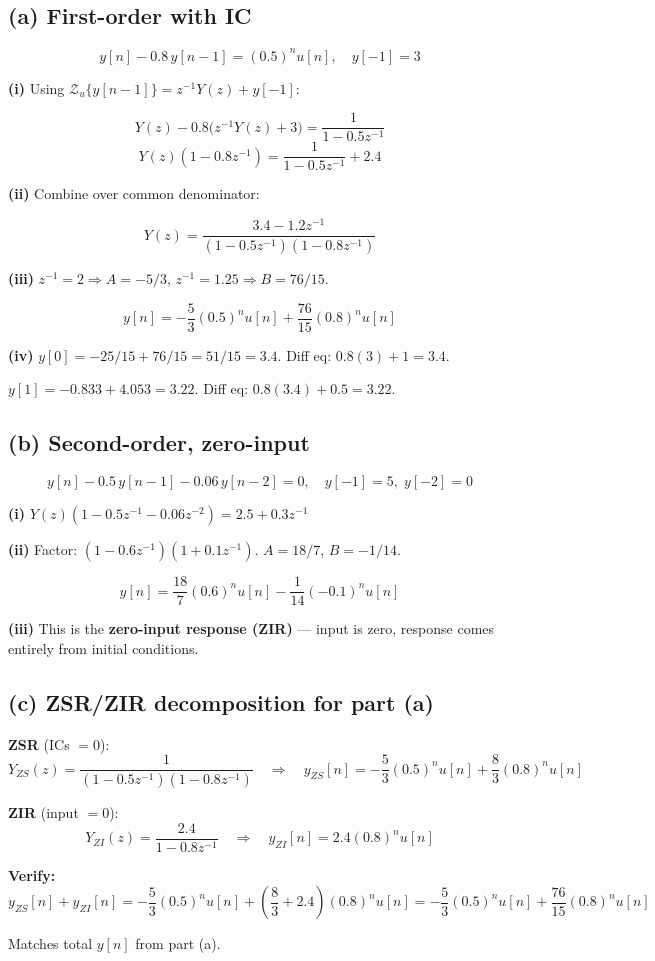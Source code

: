 \documentclass[11pt]{article}
\begin{document}
\subsection*{(a) First-order with IC}

\[
y[n] - 0.8\,y[n-1] = (0.5)^n u[n], \quad y[-1] = 3
\]

\textbf{(i)} Using $\mathcal{Z}_u\{y[n-1]\} = z^{-1}Y(z) + y[-1]$:

\[
Y(z) - 0.8\bigl(z^{-1}Y(z) + 3\bigr) = \frac{1}{1 - 0.5z^{-1}}
\]
\[
Y(z)(1 - 0.8z^{-1}) = \frac{1}{1 - 0.5z^{-1}} + 2.4
\]

\textbf{(ii)} Combine over common denominator:

\[
Y(z) = \frac{3.4 - 1.2z^{-1}}{(1 - 0.5z^{-1})(1 - 0.8z^{-1})}
\]

\textbf{(iii)} $z^{-1}=2 \Rightarrow A = -5/3$, \quad $z^{-1}=1.25 \Rightarrow B = 76/15$.

\begin{equation*}
\boxed{y[n] = -\frac{5}{3}(0.5)^n u[n] + \frac{76}{15}(0.8)^n u[n]}
\end{equation*}

\textbf{(iv)} $y[0] = -25/15 + 76/15 = 51/15 = 3.4$. Diff eq: $0.8(3)+1 = 3.4$. \checkmark

$y[1] = -0.833 + 4.053 = 3.22$. Diff eq: $0.8(3.4)+0.5 = 3.22$. \checkmark

\subsection*{(b) Second-order, zero-input}

\[
y[n] - 0.5\,y[n-1] - 0.06\,y[n-2] = 0, \quad y[-1] = 5,\; y[-2] = 0
\]

\textbf{(i)} $Y(z)(1 - 0.5z^{-1} - 0.06z^{-2}) = 2.5 + 0.3z^{-1}$

\textbf{(ii)} Factor: $(1 - 0.6z^{-1})(1 + 0.1z^{-1})$. \quad $A = 18/7$, \quad $B = -1/14$.

\begin{equation*}
\boxed{y[n] = \frac{18}{7}(0.6)^n u[n] - \frac{1}{14}(-0.1)^n u[n]}
\end{equation*}

\textbf{(iii)} This is the \textbf{zero-input response (ZIR)} --- input is zero, response comes entirely from initial conditions.

\subsection*{(c) ZSR/ZIR decomposition for part (a)}

\textbf{ZSR} (ICs $= 0$):
\[
Y_{ZS}(z) = \frac{1}{(1-0.5z^{-1})(1-0.8z^{-1})} \quad \Rightarrow \quad y_{ZS}[n] = -\frac{5}{3}(0.5)^n u[n] + \frac{8}{3}(0.8)^n u[n]
\]

\textbf{ZIR} (input $= 0$):
\[
Y_{ZI}(z) = \frac{2.4}{1-0.8z^{-1}} \quad \Rightarrow \quad y_{ZI}[n] = 2.4(0.8)^n u[n]
\]

\textbf{Verify:}
\[
y_{ZS}[n] + y_{ZI}[n] = -\frac{5}{3}(0.5)^n u[n] + \left(\frac{8}{3} + 2.4\right)(0.8)^n u[n] = -\frac{5}{3}(0.5)^n u[n] + \frac{76}{15}(0.8)^n u[n]
\]

Matches total $y[n]$ from part (a). \checkmark
\end{document}
